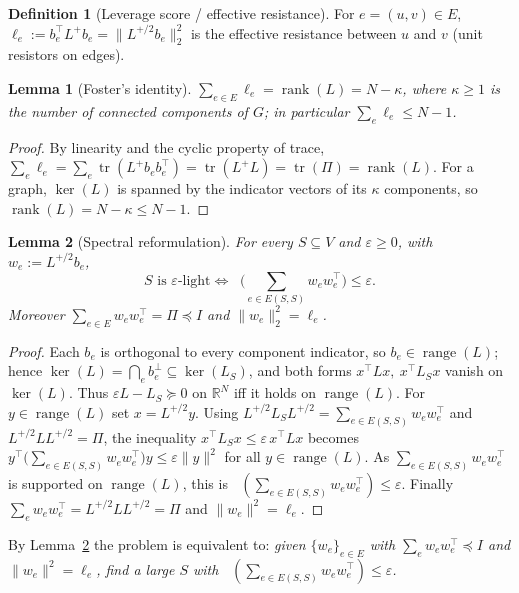\documentclass[12pt]{article}
\DeclareMathOperator{\tr}{tr}
\DeclareMathOperator{\rank}{rank}
\DeclareMathOperator{\range}{range}
\DeclareMathOperator*{\lammax}{\lambda_{\max}}
\newcommand{\bR}{\mathbb{R}}
\newcommand{\eps}{\varepsilon}
\newtheorem{lemma}{Lemma}
\theoremstyle{definition}
\newtheorem{definition}{Definition}
\begin{document}
\begin{definition}[Leverage score / effective resistance]
For $e=(u,v)\in E$, $\ell_e:=b_e^{\top}L^{+}b_e=\|L^{+/2}b_e\|_2^{2}$ is the
effective resistance between $u$ and $v$ (unit resistors on edges).
\end{definition}

\begin{lemma}[Foster's identity]\label{lem:foster}
$\displaystyle\sum_{e\in E}\ell_e=\rank(L)=N-\kappa$, where $\kappa\ge1$ is the
number of connected components of $G$; in particular $\sum_e\ell_e\le N-1$.
\end{lemma}

\begin{proof}
By linearity and the cyclic property of trace,
$\sum_e\ell_e=\sum_e\tr(L^{+}b_eb_e^{\top})=\tr(L^{+}L)=\tr(\Pi)=\rank(L)$. For a
graph, $\ker(L)$ is spanned by the indicator vectors of its $\kappa$ components,
so $\rank(L)=N-\kappa\le N-1$.
\end{proof}

\begin{lemma}[Spectral reformulation]\label{lem:reform}
For every $S\subseteq V$ and $\eps\ge0$, with $w_e:=L^{+/2}b_e$,
\[
  S\text{ is $\eps$-light}
  \iff
  \lammax\!\Big(\textstyle\sum_{e\in E(S,S)}w_ew_e^{\top}\Big)\le\eps .
\]
Moreover $\sum_{e\in E}w_ew_e^{\top}=\Pi\preceq I$ and $\|w_e\|_2^2=\ell_e$.
\end{lemma}

\begin{proof}
Each $b_e$ is orthogonal to every component indicator, so $b_e\in\range(L)$;
hence $\ker(L)=\bigcap_e b_e^{\perp}\subseteq\ker(L_S)$, and both forms
$x^\top Lx,\ x^\top L_Sx$ vanish on $\ker(L)$. Thus $\eps L-L_S\succeq0$ on
$\bR^N$ iff it holds on $\range(L)$. For $y\in\range(L)$ set $x=L^{+/2}y$. Using
$L^{+/2}L_SL^{+/2}=\sum_{e\in E(S,S)}w_ew_e^{\top}$ and $L^{+/2}LL^{+/2}=\Pi$,
the inequality $x^\top L_Sx\le\eps\,x^\top Lx$ becomes
$y^{\top}\big(\sum_{e\in E(S,S)}w_ew_e^{\top}\big)y\le\eps\|y\|^2$ for all
$y\in\range(L)$. As $\sum_{e\in E(S,S)}w_ew_e^{\top}$ is supported on
$\range(L)$, this is $\lammax(\sum_{e\in E(S,S)}w_ew_e^{\top})\le\eps$. Finally
$\sum_e w_ew_e^{\top}=L^{+/2}LL^{+/2}=\Pi$ and $\|w_e\|^2=\ell_e$.
\end{proof}

By Lemma~\ref{lem:reform} the problem is equivalent to: \emph{given
$\{w_e\}_{e\in E}$ with $\sum_e w_ew_e^{\top}\preceq I$ and $\|w_e\|^2=\ell_e$,
find a large $S$ with $\lammax(\sum_{e\in E(S,S)}w_ew_e^{\top})\le\eps$.}
\end{document}
